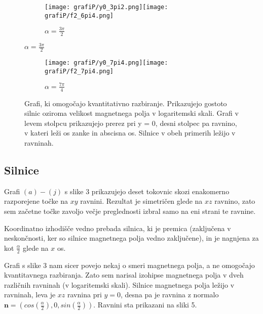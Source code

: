 \documentclass[12pt, a4paper]{article}
\begin{document}
\begin{figure}[h]
\vspace{-50pt}
  \begin{subfigure}[b]{0.5\textwidth}
    \centering
    \texttt{[image: grafiP/y0\_3pi2.png]}\texttt{[image: grafiP/f2\_6pi4.png]}
    \caption{$\alpha = \frac{3\pi}{2}$}
    \label{graf}
  \end{subfigure}
\end{figure}
\begin{figure}[h]
\vspace{-50pt}
  \begin{subfigure}[b]{0.5\textwidth}
    \centering
    \texttt{[image: grafiP/y0\_7pi4.png]}\texttt{[image: grafiP/f2\_7pi4.png]}
    \caption{$\alpha = \frac{7\pi}{4}$}
    \label{graf}
  \end{subfigure}
  \caption{Grafi, ki omogočajo kvantitativno razbiranje. Prikazujejo gostoto silnic oziroma velikost magnetnega polja v logaritemski skali. Grafi v levem stolpcu prikazujejo prerez pri y = 0, desni stolpec pa ravnino, v kateri leži os zanke in abscisna os. Silnice v obeh primerih ležijo v ravninah.}
\end{figure}




\FloatBarrier
\subsection{Silnice}
Grafi $(a) - (j)$ s slike 3 prikazujejo deset tokovnic skozi enakomerno razporejene točke na $xy$ ravnini. Rezultat je simetričen glede na $xz$ ravnino, zato sem začetne točke zavoljo večje preglednosti izbral samo na eni strani te ravnine.

Koordinatno izhodišče vedno prebada silnica, ki je premica (zaključena v neskončnosti, ker so silnice magnetnega polja vedno zaključene), in je nagnjena za kot $\frac{\alpha}{2}$ glede na $x$ os. 

Grafi s slike 3 nam sicer povejo nekaj o smeri magnetnega polja, a ne omogočajo kvantitavnega razbiranja. Zato sem narisal izohipse magnetnega polja v dveh različnih ravninah (v logaritemski skali). Silnice magnetnega polja ležijo v ravninah, leva je $xz$ ravnina pri $y = 0$, desna pa je ravnina z normalo $\mathbf{n} = (cos(\frac{\alpha}{2}), 0, sin(\frac{\alpha}{2}))$.  Ravnini sta prikazani na sliki 5. 
\end{document}
